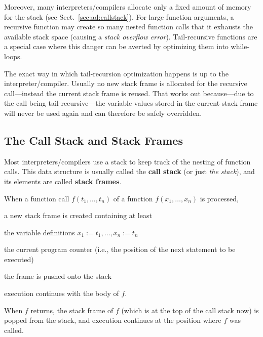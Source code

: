 Moreover, many interpreters/compilers allocate only a fixed amount of memory for the stack (see Sect.~\ref{sec:ad:callstack}).
For large function arguments, a recursive function may create so many nested function calls that it exhausts the available stack space (causing a \emph{stack overflow error}).
Tail-recursive functions are a special case where this danger can be averted by optimizing them into while-loops.

The exact way in which tail-recursion optimization happens is up to the interpreter/compiler.
Usually no new stack frame is allocated for the recursive call---instead the current stack frame is reused.
That works out because---due to the call being tail-recursive---the variable values stored in the current stack frame will never be used again and can therefore be safely overridden.

\subsection{The Call Stack and Stack Frames}

Most interpreters/compilers use a stack to keep track of the nesting of function calls.
This data structure is usually called the \textbf{call stack} (or just \emph{the stack}), and its elements are called \textbf{stack frames}.

When a function call $f(t_1,\ldots,t_n)$ of a function $f(x_1,\ldots,x_n)$ is processed,
\begin{compactitem}
 \item a new stack frame is created containing at least
   \begin{compactitem}
     \item the variable definitions $x_1:=t_1, \ldots, x_n:=t_n$
     \item the current program counter (i.e., the position of the next statement to be executed)
   \end{compactitem}
 \item the frame is pushed onto the stack
 \item execution continues with the body of $f$.
\end{compactitem}

When $f$ returns, the stack frame of $f$ (which is at the top of the call stack now) is popped from the stack, and execution continues at the position where $f$ was called.
